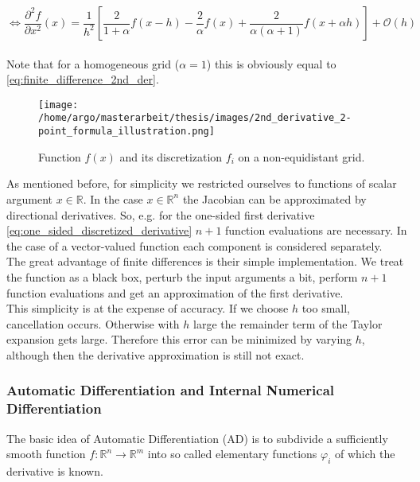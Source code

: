 \documentclass{scrartcl}[12pt, halfparskip]
\numberwithin{equation}{section}
\numberwithin{figure}{section}
\numberwithin{table}{section}
\begin{document}
\begin{equation}
\Leftrightarrow \frac{\partial^2 f}{\partial x^2}(x) = \frac{1}{h^2} \left[ \frac{2}{1+\alpha} f(x-h) - \frac{2}{\alpha} f(x) + \frac{2}{\alpha (\alpha+1)} f(x+\alpha h) \right] + \mathcal{O}(h) 
\label{eq:2_point_formula_inhomogeneous}
\end{equation} \\

Note that for a homogeneous grid ($\alpha=1$) this is obviously equal to \cref{eq:finite_difference_2nd_der}. \\

\begin{figure}[H]
	\centering
	\texttt{[image: /home/argo/masterarbeit/thesis/images/2nd\_derivative\_2-point\_formula\_illustration.png]}
	\caption{Function $f(x)$ and its discretization $f_i$ on a non-equidistant grid.}
	\label{fig:2_point_formula_illustration}
\end{figure}


As mentioned before, for simplicity we restricted ourselves to functions of scalar argument $x \in \mathbb{R}$. In the case $x \in \mathbb{R}^n$ the Jacobian can be approximated by directional derivatives. So, e.g. for the one-sided first derivative \cref{eq:one_sided_discretized_derivative} $n+1$ function evaluations are necessary. In the case of a vector-valued function each component is considered separately. \\

The great advantage of finite differences is their simple implementation. We treat the function as a black box, perturb the input arguments a bit, perform $n+1$ function evaluations and get an approximation of the first derivative. \\
This simplicity is at the expense of accuracy. If we choose $h$ too small, cancellation occurs. Otherwise with $h$ large the remainder term of the Taylor expansion gets large. Therefore this error can be minimized by varying $h$, although then the derivative approximation is still not exact.




\subsubsection{Automatic Differentiation and Internal Numerical Differentiation}
\label{sec:AD_IND}
\label{sec:Automatic_diff_IND_theory}
The basic idea of Automatic Differentiation (AD) is to subdivide a sufficiently smooth function ${f: \mathbb{R}^n \rightarrow \mathbb{R}^m}$ into so called elementary functions $\varphi_i$ of which the derivative is known. 
\end{document}
